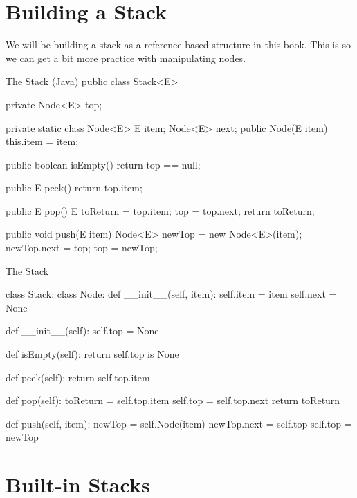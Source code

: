 \section{Building a Stack}

We will be building a stack as a reference-based structure in this book.  This is so we can get a bit more practice with manipulating nodes.


	

\begin{javacode}{The Stack (Java)}
public class Stack<E> {
	private Node<E> top;
	
	
	private static class Node<E>{
		E item;
		Node<E> next;
		public Node(E item) {
			this.item = item;
		}
	}
	
	public boolean isEmpty(){
		return top == null;
	}
	
	public E peek() {
		return top.item;
	}
	
	public E pop() {
		E toReturn =  top.item;
		top = top.next;
		return toReturn;
	}
	
	public void push(E item){
		Node<E> newTop = new Node<E>(item);
		newTop.next = top;
		top = newTop;
	}
	
		
}\end{javacode}





\begin{pycode}{The Stack}
	
class Stack:
	class Node:
		def __init__(self, item):
			self.item = item
			self.next = None
	
	def __init__(self):
		self.top = None
	
	def isEmpty(self):
		return self.top is None
	
	def peek(self):
		return self.top.item
	
	def pop(self):
		toReturn = self.top.item
		self.top = self.top.next
		return toReturn
		
	def push(self, item):
		newTop = self.Node(item)
		newTop.next = self.top
		self.top = newTop
\end{pycode}


\section{Built-in Stacks}


